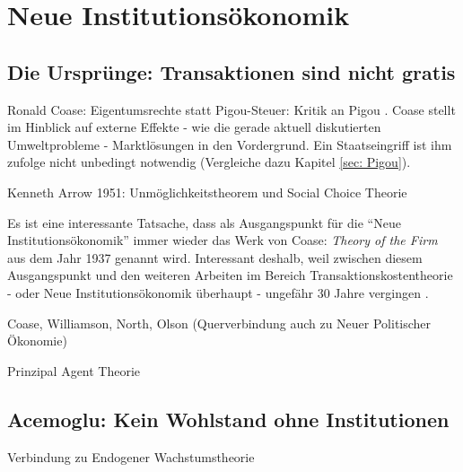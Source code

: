 %
%
%

\chapter{Neue Institutionsökonomik}
\label{Neue Institut}

\section{Die Ursprünge: Transaktionen sind nicht gratis} \label{sec: Neue Inst}

Ronald Coase: Eigentumsrechte statt Pigou-Steuer: Kritik an Pigou \textcite[S. 243]{Cansier1989}. Coase stellt im Hinblick auf externe Effekte - wie die gerade aktuell diskutierten Umweltprobleme - Marktlösungen in den Vordergrund. Ein Staatseingriff ist ihm zufolge nicht unbedingt notwendig (Vergleiche dazu Kapitel \ref{sec: Pigou}).

Kenneth Arrow 1951: Unmöglichkeitstheorem und Social Choice Theorie



Es ist eine interessante Tatsache, dass als Ausgangspunkt für die "`Neue Institutionsökonomik"' immer wieder das Werk von Coase: \textit{Theory of the Firm} aus dem Jahr 1937 genannt wird. Interessant deshalb, weil zwischen diesem Ausgangspunkt und den weiteren Arbeiten im Bereich Transaktionskostentheorie -  oder Neue Institutionsökonomik überhaupt - ungefähr 30 Jahre vergingen \parencite[S. 148]{Blaug2001}.

Coase, Williamson, North, Olson (Querverbindung auch zu Neuer Politischer Ökonomie)

Prinzipal Agent Theorie


\section{Acemoglu: Kein Wohlstand ohne Institutionen}
Verbindung zu Endogener Wachstumstheorie \textcite[S. 633ff]{Snowdon2005}

